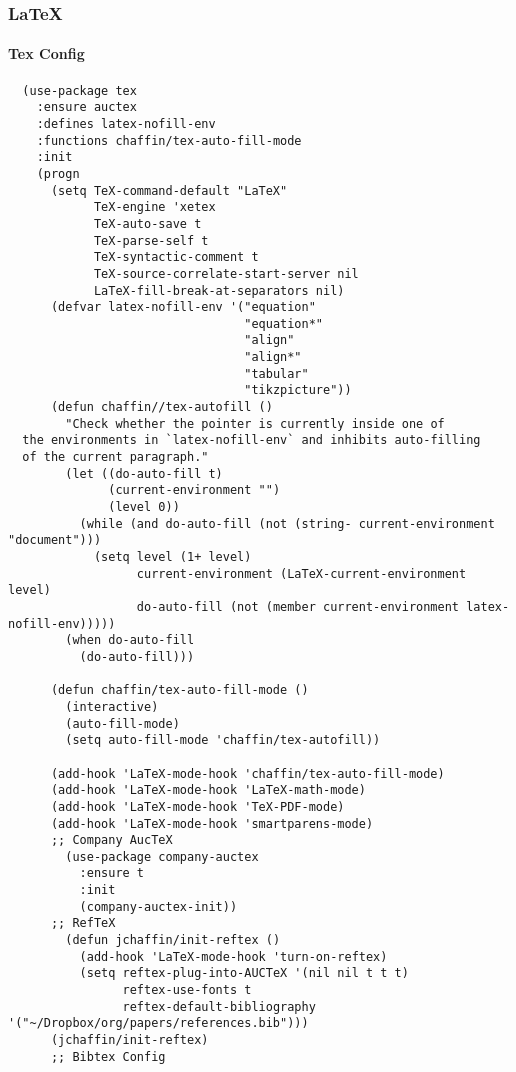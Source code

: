 \documentclass[11pt]{article}
\begin{document}
\subsubsection*{\LaTeX{}}
\label{sec:org60e7524}
\paragraph*{Tex Config}
\label{sec:orgb958070}

\begin{verbatim}
  (use-package tex
    :ensure auctex
    :defines latex-nofill-env
    :functions chaffin/tex-auto-fill-mode
    :init
    (progn
      (setq TeX-command-default "LaTeX"
            TeX-engine 'xetex
            TeX-auto-save t
            TeX-parse-self t
            TeX-syntactic-comment t
            TeX-source-correlate-start-server nil
            LaTeX-fill-break-at-separators nil)
      (defvar latex-nofill-env '("equation"
                                 "equation*"
                                 "align"
                                 "align*"
                                 "tabular"
                                 "tikzpicture"))
      (defun chaffin//tex-autofill ()
        "Check whether the pointer is currently inside one of
  the environments in `latex-nofill-env` and inhibits auto-filling
  of the current paragraph."
        (let ((do-auto-fill t)
              (current-environment "")
              (level 0))
          (while (and do-auto-fill (not (string- current-environment "document")))
            (setq level (1+ level)
                  current-environment (LaTeX-current-environment level)
                  do-auto-fill (not (member current-environment latex-nofill-env)))))
        (when do-auto-fill
          (do-auto-fill)))

      (defun chaffin/tex-auto-fill-mode ()
        (interactive)
        (auto-fill-mode)
        (setq auto-fill-mode 'chaffin/tex-autofill))

      (add-hook 'LaTeX-mode-hook 'chaffin/tex-auto-fill-mode)
      (add-hook 'LaTeX-mode-hook 'LaTeX-math-mode)
      (add-hook 'LaTeX-mode-hook 'TeX-PDF-mode)
      (add-hook 'LaTeX-mode-hook 'smartparens-mode)
      ;; Company AucTeX
        (use-package company-auctex
          :ensure t
          :init
          (company-auctex-init))
      ;; RefTeX
        (defun jchaffin/init-reftex ()
          (add-hook 'LaTeX-mode-hook 'turn-on-reftex)
          (setq reftex-plug-into-AUCTeX '(nil nil t t t)
                reftex-use-fonts t
                reftex-default-bibliography '("~/Dropbox/org/papers/references.bib")))
      (jchaffin/init-reftex)
      ;; Bibtex Config
      

\end{verbatim}
\end{document}
